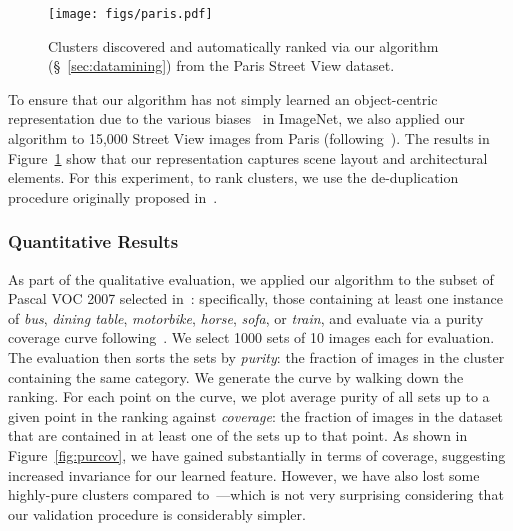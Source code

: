\documentclass[10pt,twocolumn,letterpaper]{article}
\begin{document}
\begin{figure}[t]
\begin{center}

   \texttt{[image: figs/paris.pdf]}
   \vspace{-.2cm}
\end{center}
\vspace{-0.05in}
   \caption{Clusters discovered and automatically ranked via our algorithm (\S~\ref{sec:datamining}) from the Paris Street View dataset. }
   \vspace{-0.1in}
\label{fig:paris}
\end{figure}


To ensure that our algorithm has not simply learned an object-centric representation due to the various biases~\cite{torralba11} in ImageNet, we also applied our algorithm to 15,000 Street View images from Paris (following~\cite{doersch2012makes}).  The results in Figure~\ref{fig:paris} show that our representation captures scene layout and architectural elements. For this experiment, to rank clusters, we use the de-duplication procedure originally proposed in~\cite{doersch2012makes}.





\vspace{-0.15in}
\subsubsection{Quantitative Results} \label{quantitative}\vspace{-0.05in} 
As part of the qualitative evaluation, we applied our algorithm to the subset of Pascal VOC 2007 selected in~\cite{singh2012unsupervised}: specifically, those containing at least one instance of \textit{bus}, \textit{dining table}, \textit{motorbike}, \textit{horse}, \textit{sofa}, or \textit{train}, and evaluate via a purity coverage curve following~\cite{doersch2014context}.  We select 1000 sets of 10 images each for evaluation.  The evaluation then sorts the sets by \textit{purity}: the fraction of images in the cluster containing the same category.  We generate the curve by walking down the ranking.  For each point on the curve, we plot average purity of all sets up to a given point in the ranking against \textit{coverage}: the fraction of images in the dataset that are contained in at least one of the sets up to that point.  As shown in Figure~\ref{fig:purcov}, we have gained substantially in terms of coverage, suggesting increased invariance for our learned feature.  However, we have also lost some highly-pure clusters compared to~\cite{doersch2014context}---which is not very surprising considering that our validation procedure is considerably simpler.  
\end{document}

